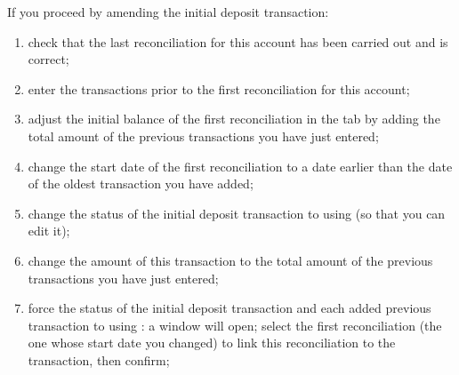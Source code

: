 If you proceed by amending the initial deposit transaction:
\begin{enumerate}
	\item check that the last reconciliation for this account has been carried out and is correct;
	\item enter the transactions prior to the first reconciliation for this account;
	\item adjust the initial balance of the first reconciliation in the  tab by adding the total amount of the previous transactions you have just entered;
	\item change the start date of the first reconciliation to a date earlier than the date of the oldest transaction you have added;
	\item change the status of the initial deposit transaction to  using  (so that you can edit it);
	\item change the amount of this transaction to the total amount of the previous transactions you have just entered;
	\item force the status of the initial deposit transaction and each added previous transaction to  using : a window will open; select the first reconciliation (the one whose start date you changed) to link this reconciliation to the transaction, then confirm;

\end{enumerate}
